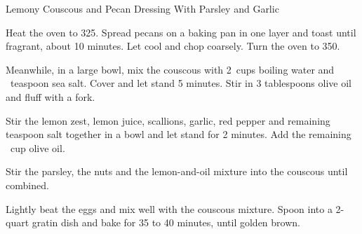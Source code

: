 \begin{recipe}[\vegan]{Lemony Couscous and Pecan Dressing With Parsley and Garlic}

    \begin{ingredients}
    \end{ingredients}

    \begin{instructions}
        Heat the oven to 325\degF.
        Spread pecans on a baking pan in one layer and toast until fragrant, about 10 minutes.
        Let cool and chop coarsely.
        Turn the oven to 350\degF.

        Meanwhile, in a large bowl, mix the couscous with 2\half~cups boiling water and \quarter~teaspoon sea salt.
        Cover and let stand 5 minutes.
        Stir in 3 tablespoons olive oil and fluff with a fork.

        Stir the lemon zest, lemon juice, scallions, garlic, red pepper and remaining teaspoon salt together in a bowl and let stand for 2 minutes.
        Add the remaining \half~cup olive oil.

        Stir the parsley, the nuts and the lemon-and-oil mixture into the couscous until combined.

        Lightly beat the eggs and mix well with the couscous mixture.
        Spoon into a 2-quart gratin dish and bake for 35 to 40 minutes, until golden brown. 
    \end{instructions}
\end{recipe}
